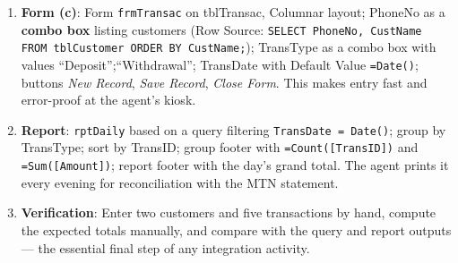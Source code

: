 \documentclass[11pt]{article}
\begin{document}
\begin{exoresolu}
\begin{enumerate}
\begin{center}
\begin{tabularx}{\linewidth}{|l|X|X|}
\hline
\end{tabularx}
\end{center}
SQL:
\texttt{SELECT CustName, Sum(IIf(TransType="Deposit",Amount,0)) AS Deposits, Sum(IIf(TransType="Withdrawal",Amount,0)) AS Withdrawals FROM tblCustomer INNER JOIN tblTransac ON tblCustomer.PhoneNo=tblTransac.PhoneNo GROUP BY CustName;}
The agent immediately sees each customer's position; the difference Deposits $-$ Withdrawals can be added as a further calculated column: \texttt{Balance: [Deposits]-[Withdrawals]}.
\item \textbf{Form (c)}: Form \texttt{frmTransac} on tblTransac, Columnar layout; PhoneNo as a \textbf{combo box} listing customers (Row Source: \texttt{SELECT PhoneNo, CustName FROM tblCustomer ORDER BY CustName;}); TransType as a combo box with values ``Deposit'';``Withdrawal''; TransDate with Default Value \texttt{=Date()}; buttons \emph{New Record}, \emph{Save Record}, \emph{Close Form}. This makes entry fast and error-proof at the agent's kiosk.
\item \textbf{Report}: \texttt{rptDaily} based on a query filtering \texttt{TransDate = Date()}; group by TransType; sort by TransID; group footer with \texttt{=Count([TransID])} and \texttt{=Sum([Amount])}; report footer with the day's grand total. The agent prints it every evening for reconciliation with the MTN statement.
\item \textbf{Verification}: Enter two customers and five transactions by hand, compute the expected totals manually, and compare with the query and report outputs --- the essential final step of any integration activity.
\end{enumerate}
\end{exoresolu}
\end{document}
